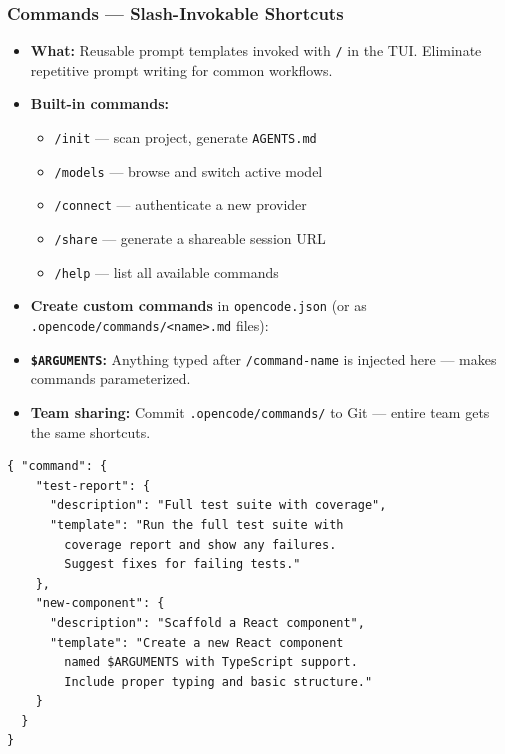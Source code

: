 \begin{frame}[fragile]\frametitle{Commands — Slash-Invokable Shortcuts}
  \begin{itemize}
    \item \textbf{What:} Reusable prompt templates invoked with \texttt{/} in the TUI. Eliminate repetitive prompt writing for common workflows.
    \item \textbf{Built-in commands:}
      \begin{itemize}
        \item \texttt{/init} — scan project, generate \texttt{AGENTS.md}
        \item \texttt{/models} — browse and switch active model
        \item \texttt{/connect} — authenticate a new provider
        \item \texttt{/share} — generate a shareable session URL
        \item \texttt{/help} — list all available commands
      \end{itemize}
    \item \textbf{Create custom commands} in \texttt{opencode.json} (or as \texttt{.opencode/commands/<name>.md} files):

    \item \textbf{\texttt{\$ARGUMENTS}:} Anything typed after \texttt{/command-name} is injected here — makes commands parameterized.
    \item \textbf{Team sharing:} Commit \texttt{.opencode/commands/} to Git — entire team gets the same shortcuts.
  \end{itemize}
  
\begin{lstlisting}
{ "command": {
    "test-report": {
      "description": "Full test suite with coverage",
      "template": "Run the full test suite with
        coverage report and show any failures.
        Suggest fixes for failing tests."
    },
    "new-component": {
      "description": "Scaffold a React component",
      "template": "Create a new React component
        named $ARGUMENTS with TypeScript support.
        Include proper typing and basic structure."
    }
  }
}
\end{lstlisting}  
\end{frame}

